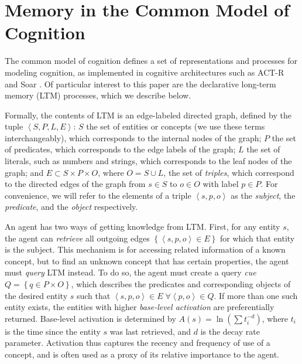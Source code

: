 \documentclass[10pt,letterpaper]{article}
\newcommand{\setof}[1]{\left \{ #1 \right \}}
\newcommand{\tuple}[1]{\left \langle #1 \right \rangle }
\begin{document}

\section{Memory in the Common Model of Cognition}

The common model of cognition \cite{Laird2017AStandardModel} defines a set of representations and processes for modeling cognition, as implemented in cognitive architectures such as ACT-R and Soar \cite{Anderson2007HowCanThe,Laird2012TheSoarCognitive}.
Of particular interest to this paper are the declarative long-term memory (LTM) processes, which we describe below.

Formally, the contents of LTM is an edge-labeled directed graph, defined by the tuple $\tuple{S, P, L, E}$:
$S$ the set of entities or concepts (we use these terms interchangeably), which corresponds to the internal nodes of the graph;
$P$ the set of predicates, which corresponds to the edge labels of the graph;
$L$ the set of literals, such as numbers and strings, which corresponds to the leaf nodes of the graph;
and $E{\subset}S{\times}P{\times}O$, where $O=S{\cup}L$, the set of \emph{triples}, which correspond to the directed edges of the graph from $s{\in}S$ to $o{\in}O$ with label $p{\in}P$.
For convenience, we will refer to the elements of a triple $\tuple{s, p, o}$ as the \emph{subject}, the \emph{predicate}, and the \emph{object} respectively.

An agent has two ways of getting knowledge from LTM.
First, for any entity $s$, the agent can \emph{retrieve} all outgoing edges $\setof{\tuple{s, p, o}{\in}E}$ for which that entity is the subject.
This mechanism is for accessing related information of a known concept, but to find an unknown concept that has certain properties, the agent must \emph{query} LTM instead.
To do so, the agent must create a query \emph{cue} $Q = \setof{q{\in}P{\times}O}$, which describes the predicates and corresponding objects of the desired entity $s$ such that $\tuple{s, p, o}{\in}E \; \forall \tuple{p, o}{\in}Q$.
If more than one such entity exists, the entities with higher \emph{base-level activation} are preferentially returned.
Base-level activation is determined by $A(s) = \ln (\sum {t_i^{-d}})$, where $t_i$ is the time since the entity $s$ was last retrieved, and $d$ is the decay rate parameter.
Activation thus captures the recency and frequency of use of a concept, and is often used as a proxy of its relative importance to the agent.
\end{document}
